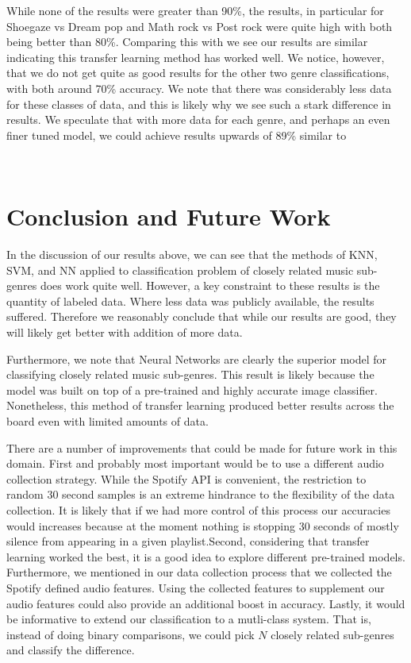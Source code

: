 \documentclass[letterpaper, 12 pt, conference]{ieeeconf}  %
\begin{document}
\par While none of the results were greater than 90\%, the results, in particular for Shoegaze vs Dream pop and Math rock vs Post rock were quite high with both being better than 80\%. Comparing this with \cite{c7} we see our results are similar indicating this transfer learning method has worked well. We notice, however, that we do not get quite as  
good results for the other two genre classifications, with both around 70\% accuracy. We note that there was considerably less data for these classes of data, and this is likely why we see such a stark difference in results. We speculate that with more data for each genre, and perhaps an even finer tuned model, we could achieve results upwards of 89\% similar to \cite{c7}


\newline \,\,



\section{Conclusion and Future Work}

In the discussion of our results above, we can see that the methods of KNN, SVM, and NN applied to classification problem of closely related music sub-genres does work quite well. However, a key constraint to these results is the quantity of labeled data. Where less data was publicly available, the results suffered. Therefore we reasonably conclude that while our results are good, they will likely get better with addition of more data.   

Furthermore, we note that Neural Networks are clearly the superior model for classifying closely related music sub-genres. This result is likely because the model was built on top of a pre-trained and highly accurate image classifier. Nonetheless, this method of transfer learning produced better results across the board even with limited amounts of data. 

There are a number of improvements that could be made for future work in this domain. First and probably most important would be to use a different audio collection strategy. While the Spotify API is convenient, the restriction to random 30 second samples is an extreme hindrance to the flexibility of the data collection. It is likely that if we had more control of this process our accuracies would increases because at the moment nothing is stopping 30 seconds of mostly silence from appearing in a given playlist.Second, considering that transfer learning worked the best, it is a good idea to explore different pre-trained models. Furthermore, we mentioned in our data collection process that we collected the Spotify defined audio features. Using the collected features to supplement our audio features could also provide an additional boost in accuracy. Lastly, it would be informative to extend our classification to a mutli-class system. That is, instead of doing binary comparisons, we could pick $N$ closely related sub-genres and classify the difference. 
\end{document}

